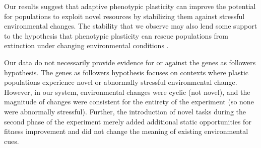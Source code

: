 Our results suggest that adaptive phenotypic plasticity can improve the potential for populations to exploit novel resources by stabilizing them against stressful environmental changes.
The stability that we observe may also lend some support to the hypothesis that phenotypic plasticity can rescue populations from extinction under changing environmental conditions \citep{chevin_adaptation_2010}.

Our data do not necessarily provide evidence for or against the genes as followers hypothesis.
The genes as followers hypothesis focuses on contexts where plastic populations experience novel or abnormally stressful environmental change.
However, in our system, environmental changes were cyclic (not novel), and the magnitude of changes were consistent for the entirety of the experiment (so none were abnormally stressful).
Further, the introduction of novel tasks during the second phase of the experiment merely added additional static opportunities for fitness improvement and did not change the meaning of existing environmental cues. %


\vspace{0.25cm}
